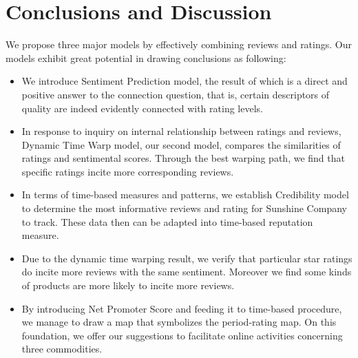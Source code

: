 \documentclass[12pt]{article}%
\begin{document}
\section{Conclusions and Discussion}
We propose three major models by effectively combining reviews and ratings. Our models exhibit great potential in drawing conclusions as following:
\begin{itemize}
	\item We introduce Sentiment Prediction model, the result of which is a direct and positive answer to the connection question, that is, certain descriptors of quality are indeed evidently connected with rating levels. 
	\item In response to inquiry on internal relationship between ratings and reviews, Dynamic Time Warp model, our second model, compares the similarities of ratings and sentimental scores. Through the best warping path, we find that specific ratings incite more corresponding reviews. 
	\item  In terms of time-based measures and patterns, we establish Credibility model to determine the most informative reviews and rating for Sunshine Company to track. These data then can be adapted into time-based reputation measure.
	\item Due to the dynamic time warping result, we verify that particular star ratings do incite more reviews with the same sentiment. Moreover we find some kinds of products are more likely to incite more reviews.
	\item  By introducing Net Promoter Score and feeding it to time-based procedure, we manage to draw a map that symbolizes the period-rating map. On this foundation, we offer our suggestions to facilitate online activities concerning three commodities.
\end{itemize}
\end{document}

